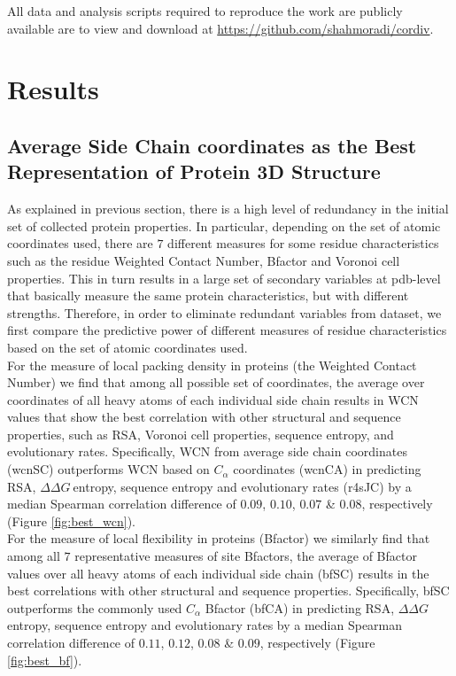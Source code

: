 \documentclass[12pt]{article}
\newcommand{\ddg}{$\Delta\Delta G~$}
\begin{document}
All data and analysis scripts required to reproduce the work are publicly available are to view and download at \url{https://github.com/shahmoradi/cordiv}.


\section{Results}
\label{sec:results}

    \subsection*{Average Side Chain coordinates as the Best Representation of Protein 3D Structure}

        As explained in previous section, there is a high level of redundancy in the initial set of collected protein properties. In particular, depending on the set of atomic coordinates used, there are $7$ different measures for some residue characteristics such as the residue Weighted Contact Number, Bfactor and Voronoi cell properties. This in turn results in a large set of secondary variables at pdb-level that basically measure the same protein characteristics, but with different strengths.  Therefore, in order to eliminate redundant variables from dataset, we first compare the predictive power of different measures of residue characteristics based on the set of atomic coordinates used.
        \\

        For the measure of local packing density in proteins (the Weighted Contact Number) we find that among all possible set of coordinates, the average over coordinates of all heavy atoms of each individual side chain results in WCN values that show the best correlation with other structural and sequence properties, such as RSA, Voronoi cell properties, sequence entropy, and evolutionary rates. Specifically, WCN from average side chain coordinates (wcnSC) outperforms WCN based on $C_\alpha$ coordinates (wcnCA) in predicting RSA, \ddg entropy, sequence entropy and evolutionary rates (r4sJC) by a median Spearman correlation difference of $0.09$, $0.10$, $0.07$ \& $0.08$, respectively (Figure \ref{fig:best_wcn}).
        \\

        For the measure of local flexibility in proteins (Bfactor) we similarly find that among all $7$ representative measures of site Bfactors, the average of Bfactor values over all heavy atoms of each individual side chain (bfSC) results in the best correlations with other structural and sequence properties. Specifically, bfSC outperforms the commonly used $C_\alpha$ Bfactor (bfCA) in predicting RSA, \ddg entropy, sequence entropy and evolutionary rates by a median Spearman correlation difference of $0.11$, $0.12$, $0.08$ \& $0.09$, respectively (Figure \ref{fig:best_bf}).
        \\
\end{document}
